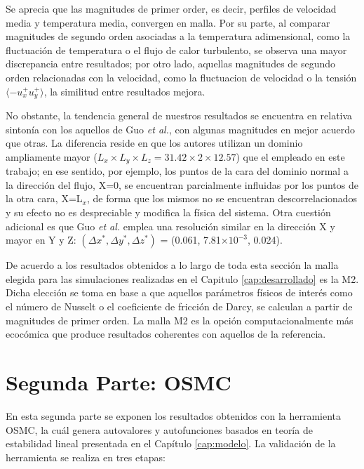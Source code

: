Se aprecia que las magnitudes de primer order, es decir, perfiles de velocidad media y temperatura media, convergen en malla. Por su parte, al comparar magnitudes de segundo orden asociadas a la temperatura adimensional, como la fluctuación de temperatura o el flujo de calor turbulento, se observa una mayor discrepancia entre resultados; por otro lado, aquellas magnitudes de segundo orden relacionadas con la velocidad, como la fluctuacion de velocidad o la tensión $\langle -u^+_x u^+_y \rangle$, la similitud entre resultados mejora. 

No obstante, la tendencia general de nuestros resultados se encuentra en relativa sintonía con los aquellos de Guo \textit{et al.}, con algunas magnitudes en mejor acuerdo que otras. La diferencia reside en que los autores utilizan un dominio ampliamente mayor ($L_x \times L_y \times L_z = 31\text{.}42 \times 2 \times 12\text{.}57$) que el empleado en este trabajo; en ese sentido, por ejemplo, los puntos de la cara del dominio normal a la dirección del flujo, X=0, se encuentran parcialmente influidas por los puntos de la otra cara, X=L$_x$, de forma que los mismos no se encuentran descorrelacionados y su efecto no es despreciable y modifica la física del sistema. Otra cuestión adicional es que Guo \textit{et al.} emplea una resolución similar en la dirección X y mayor en Y y Z: $(\Delta x^*,\Delta y^*,\Delta z^*)$ = (0.061, 7.81$\times 10^{-3}$, 0.024).

De acuerdo a los resultados obtenidos a lo largo de toda esta sección la malla elegida para las simulaciones realizadas en el Capitulo \ref{cap:desarrollado} es la M2. Dicha elección se toma en base a que aquellos parámetros físicos de interés como el número de Nusselt o el coeficiente de fricción de Darcy, se calculan a partir de magnitudes de primer orden. La malla M2 es la opción computacionalmente más ecocómica que produce resultados coherentes con aquellos de la referencia. 





\section{Segunda Parte: OSMC}

En esta segunda parte se exponen los resultados obtenidos con la herramienta OSMC, la cuál genera autovalores y autofunciones basados en teoría de estabilidad lineal presentada en el Capítulo \ref{cap:modelo}. La validación de la herramienta se realiza en tres etapas: 

